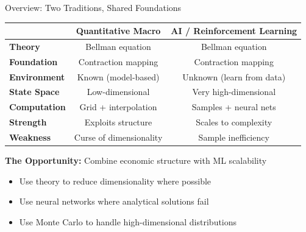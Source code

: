 \begin{frame}{Overview: Two Traditions, Shared Foundations}
\begin{center}
\renewcommand{\arraystretch}{1.3}
\begin{tabular}{|l|c|c|}
\hline
 & \textbf{Quantitative Macro} & \textbf{AI / Reinforcement Learning} \\
\hline
\textbf{Theory} & Bellman equation & Bellman equation \\
\textbf{Foundation} & Contraction mapping & Contraction mapping \\
\hline
\textbf{Environment} & Known (model-based) & Unknown (learn from data) \\
\textbf{State Space} & Low-dimensional & Very high-dimensional \\
\textbf{Computation} & Grid + interpolation & Samples + neural nets \\
\hline
\textbf{Strength} & Exploits structure & Scales to complexity \\
\textbf{Weakness} & Curse of dimensionality & Sample inefficiency \\
\hline
\end{tabular}
\end{center}

\bigskip
\textbf{The Opportunity:} Combine economic structure with ML scalability
\begin{itemize}
    \item Use theory to reduce dimensionality where possible
    \item Use neural networks where analytical solutions fail
    \item Use Monte Carlo to handle high-dimensional distributions
\end{itemize}
\end{frame}

